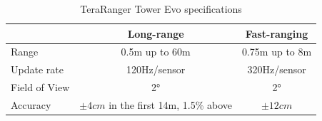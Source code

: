 \begin{table}[ht]
	\footnotesize
	\centering
	\begin{tabular}{ l c c }
		\toprule
		                & Long-range                                & Fast-ranging \\
		\midrule
		Range           & 0.5m up to 60m                            & 0.75m up to 8m \\
		Update rate     & 120Hz/sensor                              & 320Hz/sensor\\
		Field of View   & 2°                                        & 2°\\
		Accuracy        & $\pm 4cm$ in the first 14m, 1.5\% above   & $\pm 12cm$\\
		\bottomrule
	\end{tabular}
	\caption{TeraRanger Tower Evo specifications}
	\label{tab:tera_ranger_features}
\end{table}